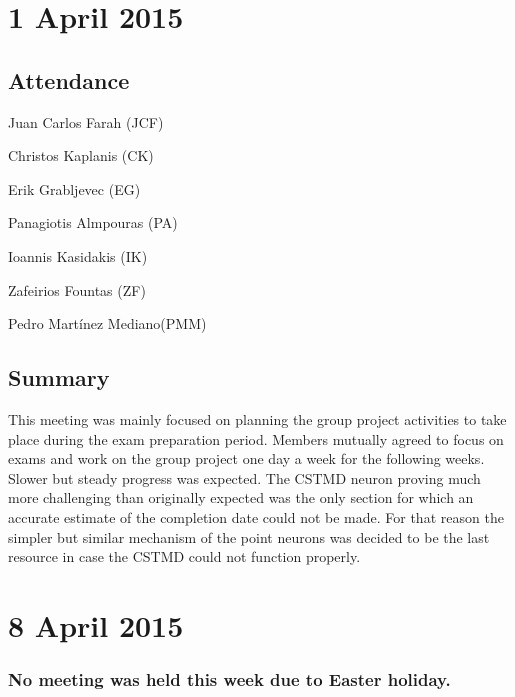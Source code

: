 \documentclass[a4paper,11pt]{article}
\begin{document}
\section*{1 April 2015}
\subsection*{Attendance}
\begin{compactenum}
\item Juan Carlos Farah (JCF)
\item Christos Kaplanis (CK)
\item Erik Grabljevec (EG)
\item Panagiotis Almpouras (PA)
\item Ioannis Kasidakis (IK)
\item Zafeirios Fountas (ZF)
\item Pedro Martínez Mediano(PMM)
\end{compactenum}

\subsection*{Summary}
This meeting was mainly focused on planning the group project activities to take place during the exam preparation period. Members mutually agreed to focus on exams and work on the group project one day a week for the following weeks. Slower but steady progress was expected.  The CSTMD neuron proving much more challenging than originally expected was the only section for which an accurate estimate of the completion date could not be made. For that reason the simpler but similar mechanism of the point neurons was decided to be the last resource in case the CSTMD could not function properly.

\maketitle
\section*{8 April 2015}
\subsubsection*{No meeting was held this week due to Easter holiday.}

\maketitle
\end{document}
